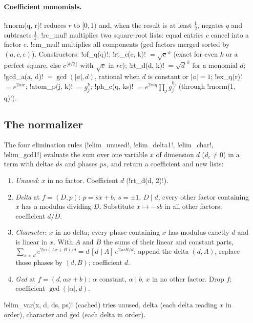 {{{\paragraph{Coefficient monomials.} \lexpy!rnorm(q, r)! reduces $r$ to $[0,1)$ and, when the
result is at least $\tfrac12$, negates $q$ and subtracts $\tfrac12$. \lexpy!rc_mul! multiplies two
square-root lists: equal entries $c$ cancel into a factor $c$. \lexpy!cm_mul! multiplies all
components (gcd factors merged sorted by $(a, c, e)$). Constructors: \lexpy!of_q(q)!;
\lexpy!rt_c(c, k)! $=\sqrt{c}^{\,k}$ (exact for even $k$ or a perfect square, else $c^{\lfloor
k/2\rfloor}$ with $\sqrt c$ in $rc$); \lexpy!rt_d(d, k)! $=\sqrt{d}^{\,k}$ for a monomial $d$;
\lexpy!gcd_a(a, d)! $=\gcd(|a|, d)$, rational when $d$ is constant or $|a|=1$; \lexpy!ex_q(r)!
$=e^{2\pi i r}$; \lexpy!atom_p(j, k)! $=g_j^{k}$; \lexpy!ph_c(q, ks)! $=e^{2\pi i q}\prod_j g_j^{k_j}$
(through \lexpy!rnorm(1, q)!).

\subsection{The normalizer}\label{sec:lean-export-sym-normalizer}

The four elimination rules (\lexpy!elim_unused!, \lexpy!elim_delta1!, \lexpy!elim_char!,
\lexpy!elim_gcd1!) evaluate the sum over one variable $x$ of dimension $d$ ($d_c\ne0$) in a term
with deltas $ds$ and phases $ps$, and return a coefficient and new lists:
\begin{enumerate}
\item \emph{Unused}: $x$ in no factor. Coefficient $d$ (\lexpy!rt_d(d, 2)!).
\item \emph{Delta} at $f=(D, p)$: $p = sx + b$, $s=\pm1$, $D \mid d$, every other factor
containing $x$ has a modulus dividing $D$. Substitute $x \mapsto -sb$ in all other factors;
coefficient $d/D$.
\item \emph{Character}: $x$ in no delta; every phase containing $x$ has modulus exactly $d$ and
is linear in $x$. With $A$ and $B$ the sums of their linear and constant parts,
$\sum_{x<d} e^{2\pi i(Ax+B)/d} = d\,[d \mid A]\,e^{2\pi i B/d}$: append the delta $(d, A)$,
replace those phases by $(d, B)$; coefficient $d$.
\item \emph{Gcd} at $f=(d, \alpha x + b)$: $\alpha$ constant, $\alpha \mid b$, $x$ in no other
factor. Drop $f$; coefficient $\gcd(|\alpha|, d)$.
\end{enumerate}
\lexpy!elim_var(x, d, ds, ps)! (cached) tries unused, delta (each delta reading $x$ in order),
character and gcd (each delta in order).

}}}
